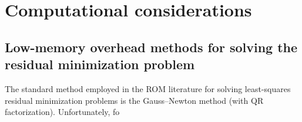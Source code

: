 \documentclass[3p,computermodern,10pt]{elsarticle}
\begin{document}

\section{Computational considerations}

\subsection{Low-memory overhead methods for solving the residual minimization problem}
The standard method employed in the ROM literature for solving least-squares residual minimization problems is the Gauss--Newton method (with QR factorization). Unfortunately, fo
\end{document}
